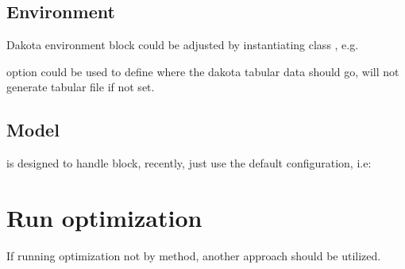 \documentclass[letterpaper,10pt,english]{sphinxmanual}
\begin{document}
\subsection{Environment}
\label{\detokenize{src/demos/demo4:environment}}
Dakota environment block could be adjusted by instantiating class
, e.g.

\begin{sphinxVerbatim}[commandchars=\\\{\},formatcom=\scriptsize]
  
  
\end{sphinxVerbatim}

 option could be used to define where the dakota tabular data
should go, will not generate tabular file if not set.


\subsection{Model}
\label{\detokenize{src/demos/demo4:model}}
 is designed to handle  block, recently, just use
the default configuration, i.e:

\begin{sphinxVerbatim}[commandchars=\\\{\},formatcom=\scriptsize]
  
\end{sphinxVerbatim}


\section{Run optimization}
\label{\detokenize{src/demos/demo5::doc}}\label{\detokenize{src/demos/demo5:run-optimization}}
If running optimization not by  method, another approach
should be utilized.

\begin{sphinxVerbatim}[commandchars=\\\{\},formatcom=\scriptsize]

 
\end{sphinxVerbatim}
\end{document}
